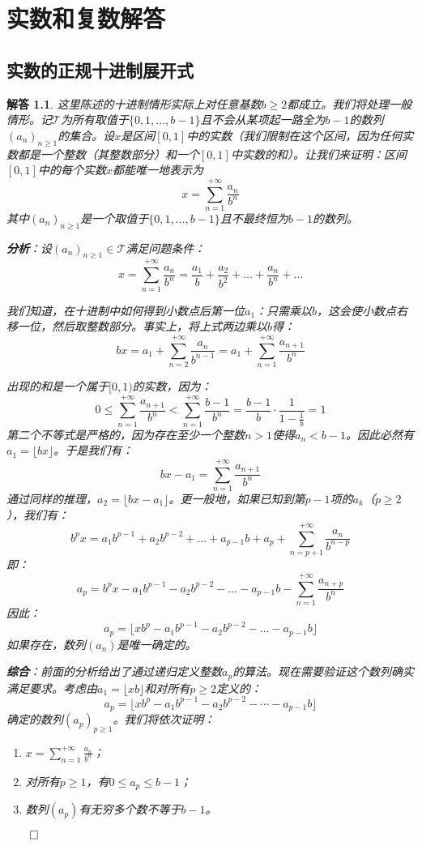 \documentclass[12pt,UTF8]{ctexbook}
\theoremstyle{exercisestyle}
\theoremstyle{solutionstyle}
\newtheorem*{solution*}{解答}
\newenvironment{solution}
  {\begin{solution*}}
  {\hfill\ensuremath{\qed}\end{solution*}}
\begin{document}
\appendix
\chapter{实数和复数解答}
\section{实数的正规十进制展开式}
\begin{solution}
这里陈述的十进制情形实际上对任意基数$b \geq 2$都成立。我们将处理一般情形。记$\mathcal T$为所有取值于$\{0,1,\ldots,b-1\}$且不会从某项起一路全为$b-1$的数列$(a_n)_{n\geq 1}$的集合。设$x$是区间$[0,1]$中的实数（我们限制在这个区间，因为任何实数都是一个整数（其整数部分）和一个$[0,1]$中实数的和）。让我们来证明：区间$[0,1]$中的每个实数$x$都能唯一地表示为
$$x = \sum_{n=1}^{+\infty} \frac{a_n}{b^n}$$
其中$(a_n)_{n \geq 1}$是一个取值于$\{0,1,\ldots,b-1\}$且不最终恒为$b-1$的数列。

\textbf{分析}：设$(a_n)_{n\geqslant 1} \in \mathcal T$满足问题条件：
$$x = \sum_{n=1}^{+\infty} \frac{a_n}{b^n} = \frac{a_1}{b} + \frac{a_2}{b^2} + \dots + \frac{a_n}{b^n} + \dots$$

我们知道，在十进制中如何得到小数点后第一位$a_1$：只需乘以$b$，这会使小数点右移一位，然后取整数部分。事实上，将上式两边乘以$b$得：
$$bx = a_1 + \sum_{n=2}^{+\infty} \frac{a_n}{b^{n-1}} = a_1 + \sum_{n=1}^{+\infty} \frac{a_{n+1}}{b^n}$$

出现的和是一个属于$[0,1)$的实数，因为：
$$0 \leqslant \sum_{n=1}^{+\infty} \frac{a_{n+1}}{b^n} < \sum_{n=1}^{+\infty} \frac{b-1}{b^n} = \frac{b-1}{b} \cdot \frac{1}{1 - \frac{1}{b}} = 1$$
第二个不等式是严格的，因为存在至少一个整数$n > 1$使得$a_n < b - 1$。因此必然有$a_1 = \lfloor bx \rfloor$。于是我们有：
$$bx - a_1 = \sum_{n=1}^{+\infty} \frac{a_{n+1}}{b^n}$$
通过同样的推理，$a_2 = \lfloor bx - a_1 \rfloor$。更一般地，如果已知到第$p-1$项的$a_k$（$p \geqslant 2$），我们有：
$$b^p x = a_1 b^{p-1} + a_2 b^{p-2} + \dots + a_{p-1} b + a_p + \sum_{n=p+1}^{+\infty} \frac{a_n}{b^{n-p}}$$
即：
$$a_p = b^p x - a_1 b^{p-1} - a_2 b^{p-2} - \dots - a_{p-1} b - \sum_{n=1}^{+\infty} \frac{a_{n+p}}{b^n}$$
因此：
$$a_p = \lfloor x b^p - a_1 b^{p-1} - a_2 b^{p-2} - \dots - a_{p-1} b \rfloor$$
如果存在，数列$(a_n)$是唯一确定的。

\textbf{综合}：前面的分析给出了通过递归定义整数$a_p$的算法。现在需要验证这个数列确实满足要求。考虑由$a_1 = \lfloor xb \rfloor$和对所有$p \ge 2$定义的：
$$a_p = \lfloor xb^p - a_1b^{p-1} - a_2b^{p-2} - \cdots - a_{p-1}b \rfloor$$
确定的数列$(a_p)_{p\geq 1}$。我们将依次证明：
\begin{enumerate}
    \item $x = \sum_{n=1}^{+\infty} \frac{a_n}{b^n}$；
    \item 对所有$p \geqslant 1$，有$0 \leqslant a_p \leqslant b - 1$；
    \item 数列$(a_p)$有无穷多个数不等于$b - 1$。
\end{enumerate}


\end{solution}
\end{document}
